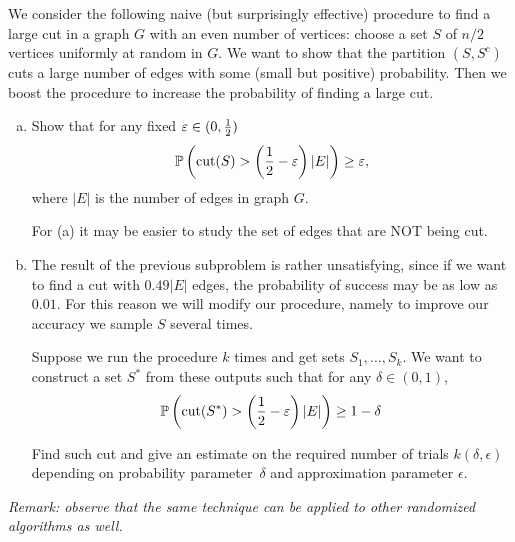 \begin{myexercise}
    \label{prob:random_max_cut}
    We consider the following naive (but surprisingly effective) procedure to find a large cut in a graph $G$ with an even number of vertices: choose a set $S$ of $n/2$ vertices uniformly at random in $G$. We want to show that the partition $(S, S^c)$ cuts a large number of edges with some (small but positive) probability. Then we boost the procedure to increase the probability of finding a large cut. 

    \begin{enumerate}[(a)]
        \item Show that for any fixed $\varepsilon \in (0, \frac{1}{2})$
        $$
        {\mathbb{P}} \left( \operatorname{cut}(S) > \left(\frac{1}{2} - \varepsilon\right) |E|  \right) \ge \varepsilon,
        $$
        where $|E|$ is the number of edges in graph $G$. 
        \begin{hint}
        For (a) it may be easier to study the set of edges that are NOT being cut.
        \end{hint}
        \item The result of the previous subproblem is rather unsatisfying, since if we want to find a cut with $0.49 |E|$ edges, the probability of success may be as low as $0.01$. For this reason we will modify our procedure, namely to improve our accuracy we sample $S$ several times.


        Suppose we run the procedure $k$ times and get sets $S_1, \dots, S_k$. We want to construct a set $S^*$ from these outputs such that for any $\delta \in (0,1)$,
        $$
        {\mathbb{P}}\left(\operatorname{cut}(S^*) > \left(\frac{1}{2} - \varepsilon\right) |E|  \right) \ge 1 - \delta
        $$
        
        Find such cut and give an estimate on the required number of trials $k(\delta, \epsilon)$ depending on probability parameter~$\delta$ and approximation parameter $\epsilon$.
    \end{enumerate}

\emph{Remark: observe that the same technique can be applied to other randomized algorithms as well. }


\end{myexercise}

